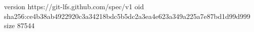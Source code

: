 version https://git-lfs.github.com/spec/v1
oid sha256:ce4b38ab4922920c3a34218bdc5b5dc2a3ea4e623a349a225a7e87bd1d99d999
size 87544
